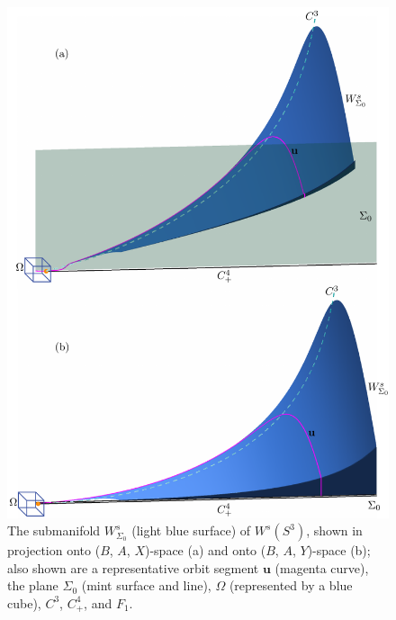 \documentclass{ws-ijbc}
\begin{document}
\begin{figure}[H]
\centering
\includegraphics[]{./figures/MKMO_4.pdf}
\caption{The submanifold $W^{s}_{\Sigma_0}$ (light blue surface) of $W^s(S^3)$, shown in projection onto ($B$, $A$, $X$)-space (a) and onto ($B$, $A$, $Y$)-space (b); also shown are a representative orbit segment $\mathbf{u}$ (magenta curve), the plane $\Sigma_0$ (mint surface and line), $\Omega$ (represented by a blue cube), $C^3$, $C^4_+$, and $F_1$.}
\label{figure_4}
\end{figure}
\end{document}

